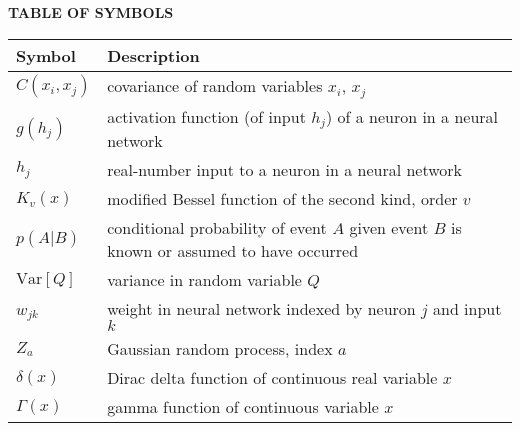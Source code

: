 \begin{table}[h]
\textbf{\textsf{TABLE OF SYMBOLS}}
\begin{center}
\begin{tabular}{|p{4.0cm}|p{12.0cm}|}
\hline
\textbf{\textsf{Symbol}}
& \textbf{\textsf{Description}} \\
\hline
$C(x_i, x_j)$ & covariance of random variables $x_i$, $x_j$ \\
$g(h_j)$ & activation function (of input $h_j$) of a neuron in a neural network \\
$h_j$ & real-number input to a neuron in a neural network \\
$K_v(x)$ & modified Bessel function of the second kind, order $v$ \\
$p(A|B)$ & conditional probability of event $A$ given event $B$ is known or assumed to have occurred \\
$\mathrm{Var}[Q]$ & variance in random variable $Q$ \\
$w_{jk}$ & weight in neural network indexed by neuron $j$ and input $k$ \\
$Z_a$ & Gaussian random process, index $a$ \\
$\delta(x)$ & Dirac delta function of continuous real variable $x$ \\
$\Gamma(x)$ & gamma function of continuous variable $x$ \\
\hline
\end{tabular}
\end{center}
\end{table}
